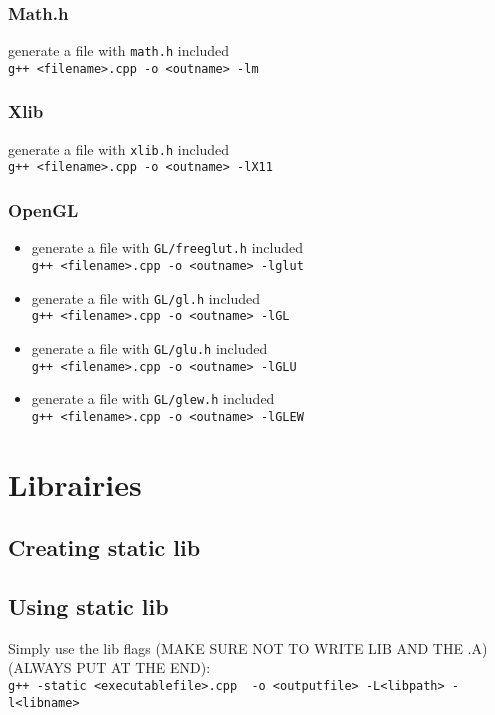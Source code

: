 \documentclass[12pt]{article}
\begin{document}
\subsubsection{Math.h}
generate a file with \verb|math.h| included \\ \verb|g++ <filename>.cpp -o <outname> -lm|
\subsubsection{Xlib}
generate a file with \verb|xlib.h| included \\ \verb|g++ <filename>.cpp -o <outname> -lX11|
\subsubsection{OpenGL}
\begin{itemize}
	\item generate a file with \verb|GL/freeglut.h| included \\ \verb|g++ <filename>.cpp -o <outname> -lglut|
	\item generate a file with \verb|GL/gl.h| included \\ \verb|g++ <filename>.cpp -o <outname> -lGL|
	\item generate a file with \verb|GL/glu.h| included \\ \verb|g++ <filename>.cpp -o <outname> -lGLU|
	\item generate a file with \verb|GL/glew.h| included \\ \verb|g++ <filename>.cpp -o <outname> -lGLEW|
\end{itemize}


\newpage
\section{Librairies}
\subsection{Creating static lib}
\subsection{Using static lib}
Simply use the lib flags (MAKE SURE NOT TO WRITE LIB AND THE .A) (ALWAYS PUT AT THE END):\\
\verb|g++ -static <executablefile>.cpp  -o <outputfile> -L<libpath> -l<libname>|
\end{document}
